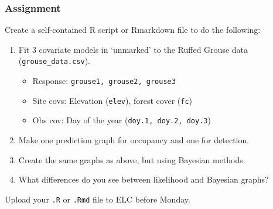 \documentclass[color=usenames,dvipsnames]{beamer}\usepackage[]{graphicx}\usepackage[]{color}
\begin{document}
\begin{frame}
  \frametitle{Assignment}
  \footnotesize
  Create a self-contained R script or Rmarkdown file
  to do the following:
  \vfill
  \begin{enumerate}
    \footnotesize
    \item Fit 3 covariate models in `unmarked' to the Ruffed Grouse data ({\tt grouse\_data.csv}). 
      \begin{itemize}
        \footnotesize
        \item Response: \texttt{grouse1, grouse2, grouse3}
        \item Site covs: Elevation (\texttt{elev}), forest cover ({\tt fc})
        \item Obs cov: Day of the year (\texttt{doy.1, doy.2, doy.3})
      \end{itemize}
    \item Make one prediction graph for occupancy and one for detection. 
    \item Create the same graphs as above, but using Bayesian methods.
    \item What differences do you see between likelihood and Bayesian graphs?
    \end{enumerate}
    \vfill
    Upload your {\tt .R} or {\tt .Rmd} file to ELC before Monday. 
\end{frame}
\end{document}
